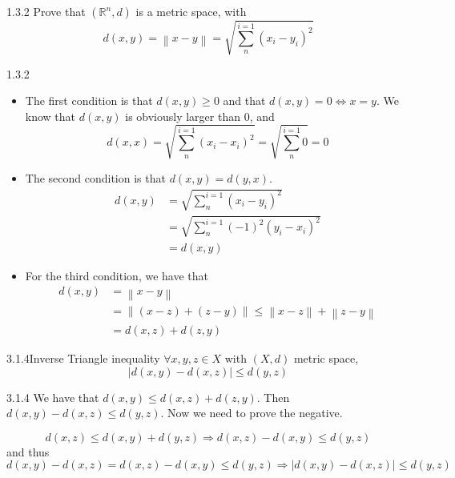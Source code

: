 \documentclass[a4paper,norsk]{article}
\renewcommand{\geq}{\geqslant}
\renewcommand{\leq}{\leqslant}
\begin{document}
\begin{oppgavebox}{1.3.2}{}
Prove that $ \left( \mathbb{R}^n, d \right)  $ is a metric space, with 
\[
    d(x, y) = \left\lVert x - y \right\rVert = \sqrt{ \sum_{ n }^{ i=1 } \left( x_i - y_i \right) ^2  }
\]


\begin{proofbox}{1.3.2}{}
  \begin{itemize}
    \item The first condition is that $ d(x, y) \geq 0 $ and that $ d(x, y) = 0 \iff x = y $. We know that $ d(x, y)  $  is obviously larger than 0, and 
    \[
        d(x, x) = \sqrt{ \sum_{ n }^{ i=1 } \left( x_i - x_i \right)^2  } = \sqrt{ \sum_{ n }^{ i=1 } 0  } = 0
    \]

    \item The second condition is that $ d(x, y) = d(y, x) $. 
    \begin{align*}
      d(x, y) &= \sqrt{ \sum_{ n }^{ i=1 } \left( x_i - y_i \right) ^2 } \\
      &= \sqrt{ \sum_{ n }^{ i=1 } \left( -1 \right)^2  \left( y_i - x_i \right) ^2 } \\
      &= d(x, y)
    \end{align*}
     
    \item For the third condition, we have that 
    \begin{align*}
      d(x, y) &= \left\lVert x - y \right\rVert \\
      &= \left\lVert \left( x - z \right) + \left( z - y \right)  \right\rVert \leq \left\lVert x-z \right\rVert + \left\lVert z-y \right\rVert \\
      &= d(x,z) + d(z,y)
    \end{align*}
    
  \end{itemize}
\end{proofbox}
\end{oppgavebox}

\begin{propositionbox}{3.1.4}{Inverse Triangle inequality}
$ \forall x, y, z \in X $ with $ \left( X, d \right)  $ metric space, 
\[
    \left| d(x, y) - d(x,z) \right| \leq d(y, z)
\]

\begin{proofbox}{3.1.4}{}
  We have that $ d(x, y) \leq d(x, z) + d(z, y) $. Then $ d(x, y) - d(x, z) \leq d(y, z) $. Now we need to prove the negative.

  \[
      d(x, z) \leq d(x, y) + d(y, z) \Rightarrow d(x, z) - d(x, y) \leq d(y, z)
  \]
  and thus
  \[
      d(x, y) - d(x, z) = d(x, z) - d(x, y) \leq d(y, z) \Rightarrow \left| d(x, y) - d(x, z)  \right| \leq d(y, z)
  \]
\end{proofbox}
\end{propositionbox}
\end{document}
